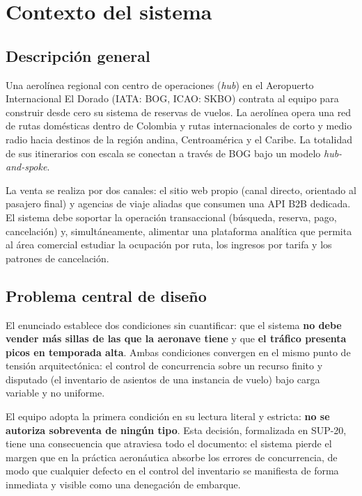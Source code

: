 \documentclass[10pt,letterpaper]{article}
\begin{document}
\tableofcontents
\newpage

\section{Contexto del sistema}

\subsection{Descripción general}
Una aerolínea regional con centro de operaciones (\emph{hub}) en el Aeropuerto Internacional El Dorado (IATA: BOG, ICAO: SKBO) contrata al equipo para construir desde cero su sistema de reservas de vuelos. La aerolínea opera una red de rutas domésticas dentro de Colombia y rutas internacionales de corto y medio radio hacia destinos de la región andina, Centroamérica y el Caribe. La totalidad de sus itinerarios con escala se conectan a través de BOG bajo un modelo \emph{hub-and-spoke}.

La venta se realiza por dos canales: el sitio web propio (canal directo, orientado al pasajero final) y agencias de viaje aliadas que consumen una API B2B dedicada. El sistema debe soportar la operación transaccional (búsqueda, reserva, pago, cancelación) y, simultáneamente, alimentar una plataforma analítica que permita al área comercial estudiar la ocupación por ruta, los ingresos por tarifa y los patrones de cancelación.

\subsection{Problema central de diseño}
El enunciado establece dos condiciones sin cuantificar: que el sistema \textbf{no debe vender más sillas de las que la aeronave tiene} y que \textbf{el tráfico presenta picos en temporada alta}. Ambas condiciones convergen en el mismo punto de tensión arquitectónica: el control de concurrencia sobre un recurso finito y disputado (el inventario de asientos de una instancia de vuelo) bajo carga variable y no uniforme.

El equipo adopta la primera condición en su lectura literal y estricta: \textbf{no se autoriza sobreventa de ningún tipo}. Esta decisión, formalizada en SUP-20, tiene una consecuencia que atraviesa todo el documento: el sistema pierde el margen que en la práctica aeronáutica absorbe los errores de concurrencia, de modo que cualquier defecto en el control del inventario se manifiesta de forma inmediata y visible como una denegación de embarque.
\end{document}
